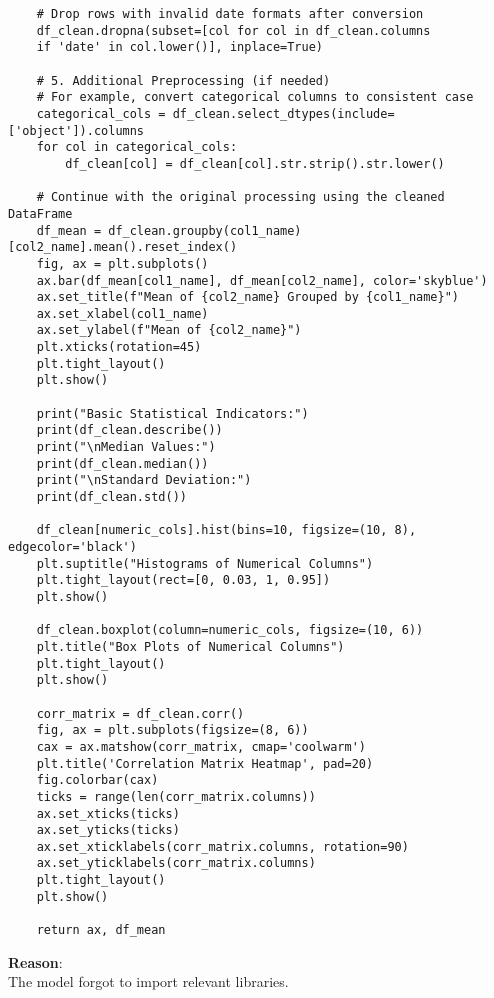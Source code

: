 \onecolumn
\begin{tcolorbox}[colback=blue!5!white, colframe=blue!75!black, title=Failed Example \#4 Generated by o1-mini, text width=\textwidth]
\small
\begin{verbatim}
    # Drop rows with invalid date formats after conversion
    df_clean.dropna(subset=[col for col in df_clean.columns 
    if 'date' in col.lower()], inplace=True)
    
    # 5. Additional Preprocessing (if needed)
    # For example, convert categorical columns to consistent case
    categorical_cols = df_clean.select_dtypes(include=['object']).columns
    for col in categorical_cols:
        df_clean[col] = df_clean[col].str.strip().str.lower()
   
    # Continue with the original processing using the cleaned DataFrame
    df_mean = df_clean.groupby(col1_name)[col2_name].mean().reset_index()
    fig, ax = plt.subplots()
    ax.bar(df_mean[col1_name], df_mean[col2_name], color='skyblue')
    ax.set_title(f"Mean of {col2_name} Grouped by {col1_name}")
    ax.set_xlabel(col1_name)
    ax.set_ylabel(f"Mean of {col2_name}")
    plt.xticks(rotation=45)
    plt.tight_layout()
    plt.show()
   
    print("Basic Statistical Indicators:")
    print(df_clean.describe())
    print("\nMedian Values:")
    print(df_clean.median())
    print("\nStandard Deviation:")
    print(df_clean.std())
   
    df_clean[numeric_cols].hist(bins=10, figsize=(10, 8), edgecolor='black')
    plt.suptitle("Histograms of Numerical Columns")
    plt.tight_layout(rect=[0, 0.03, 1, 0.95])
    plt.show()
   
    df_clean.boxplot(column=numeric_cols, figsize=(10, 6))
    plt.title("Box Plots of Numerical Columns")
    plt.tight_layout()
    plt.show()
   
    corr_matrix = df_clean.corr()
    fig, ax = plt.subplots(figsize=(8, 6))
    cax = ax.matshow(corr_matrix, cmap='coolwarm')
    plt.title('Correlation Matrix Heatmap', pad=20)
    fig.colorbar(cax)
    ticks = range(len(corr_matrix.columns))
    ax.set_xticks(ticks)
    ax.set_yticks(ticks)
    ax.set_xticklabels(corr_matrix.columns, rotation=90)
    ax.set_yticklabels(corr_matrix.columns)
    plt.tight_layout()
    plt.show()
   
    return ax, df_mean
\end{verbatim}
\textbf{Reason}:\\
The model forgot to import relevant libraries.
\end{tcolorbox}
